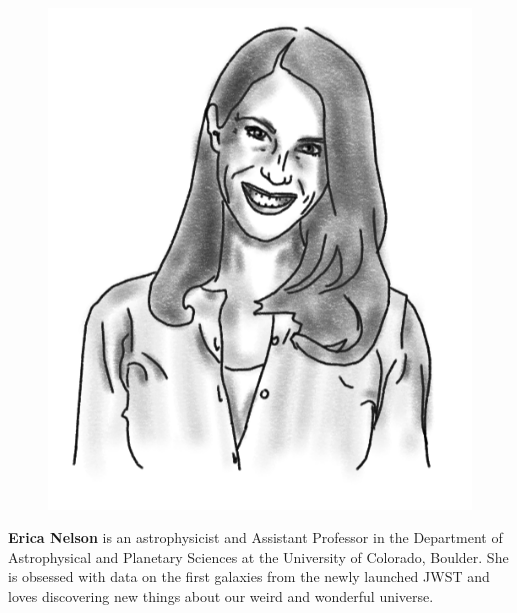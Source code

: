\begin{figure}
\vspace{-1.7\intextsep}
\includegraphics[width=0.9\linewidth]{portraits/erica.png}
\end{figure}
\textbf{Erica Nelson} is an astrophysicist and Assistant Professor in the Department of Astrophysical and Planetary Sciences at the University of Colorado, Boulder. She is obsessed with data on the first galaxies from the newly launched JWST and loves discovering new things about our weird and wonderful universe. \\
\\

